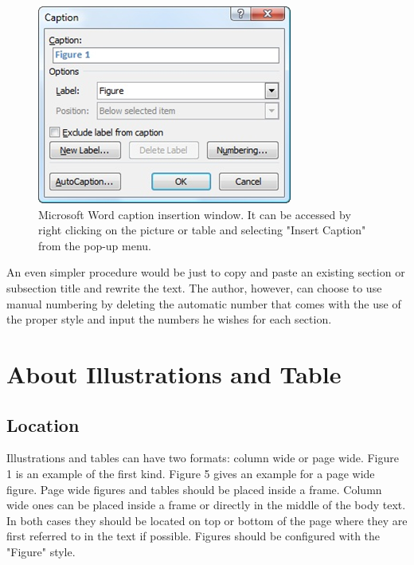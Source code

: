 \documentclass[10pt]{../imeko_acta}
\begin{document}
\begin{figure}[!tb]
	\centering
	\includegraphics[width=.955\columnwidth]{image3}
	\caption{Microsoft Word caption insertion window. It can be accessed by right clicking on the picture or table and selecting "Insert Caption" from the pop-up menu.}
	\label{fig:image3}
\end{figure}

An even simpler procedure would be just to copy and paste an existing section or subsection title and rewrite the text. The author, however, can choose to use manual numbering by deleting the automatic number that comes with the use of the proper style and input the numbers he wishes for each section.

\section{About Illustrations and Table}

\subsection{Location}

Illustrations and tables can have two formats: column wide or page wide. Figure 1 is an example of the first kind\cite{Fazio1995}. Figure 5 gives an example for a page wide figure.
Page wide figures and tables should be placed inside a frame. Column wide ones can be placed inside a frame or directly in the middle of the body text. In both cases they should be located on top or bottom of the page where they are first referred to in the text if possible. Figures should be configured with the "Figure" style.
\end{document}
